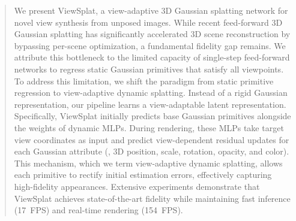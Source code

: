 \documentclass[runningheads]{llncs}
\newcommand{\hj}[1]{\textcolor{red}{{HJ:#1}}}
\begin{document}
\begin{abstract}
We present ViewSplat, a view-adaptive 3D Gaussian splatting network for novel view synthesis from unposed images.
While recent feed-forward 3D Gaussian splatting has significantly accelerated 3D scene reconstruction by bypassing per-scene optimization, a fundamental fidelity gap remains.
We attribute this bottleneck to the limited capacity of single-step feed-forward networks to regress static Gaussian primitives that satisfy all viewpoints.
To address this limitation, we shift the paradigm from static primitive regression to view-adaptive dynamic splatting.
Instead of a rigid Gaussian representation, our pipeline learns a view-adaptable latent representation.
Specifically, ViewSplat initially predicts base Gaussian primitives alongside the weights of dynamic MLPs.
During rendering, these MLPs take target view coordinates as input and predict view-dependent residual updates for each Gaussian attribute (\ie, 3D position, scale, rotation, opacity, and color).
This mechanism, which we term view-adaptive dynamic splatting, allows each primitive to rectify initial estimation errors, effectively capturing high-fidelity appearances.
Extensive experiments demonstrate that ViewSplat achieves state-of-the-art fidelity while maintaining fast inference (17~FPS) and real-time rendering (154~FPS).
\end{abstract}
\end{document}
